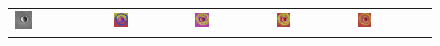 \begin{figure}[h!]
\begin{tabular}{p{}p{}p{}p{}p{}}
	\includegraphics[width=0.2\textwidth]{images/Gre13_01.jpg} &
	\includegraphics[width=0.2\textwidth]{images/gen/GEN_filterbanks_Gre13_01_TSUGF.png} &
	\includegraphics[width=0.2\textwidth]{images/gen/GEN_filterbanks_Gre13_01_LM.png} &
	\includegraphics[width=0.2\textwidth]{images/gen/GEN_filterbanks_Gre13_01_S.png} &
	\includegraphics[width=0.2\textwidth]{images/gen/GEN_filterbanks_Gre13_01_MR.png} \\
	

\end{tabular}
\end{figure}
